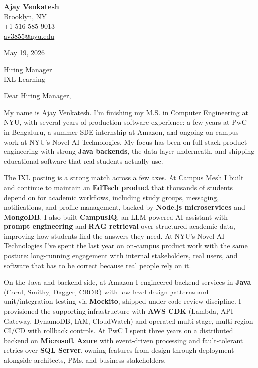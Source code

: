 \documentclass[letterpaper,11pt]{article}
\begin{document}
\begin{flushleft}
\textbf{\large Ajay Venkatesh} \\
Brooklyn, NY \\
+1 516 585 9013 \\
\href{mailto:av3855@nyu.edu}{av3855@nyu.edu}
\end{flushleft}

\vspace{10pt}

May 19, 2026

\vspace{6pt}

Hiring Manager \\
IXL Learning

\vspace{10pt}

Dear Hiring Manager,

My name is Ajay Venkatesh. I'm finishing my M.S. in Computer Engineering at NYU, with several years of production software experience: a few years at PwC in Bengaluru, a summer SDE internship at Amazon, and ongoing on-campus work at NYU's Novel AI Technologies. My focus has been on full-stack product engineering with strong \textbf{Java backends}, the data layer underneath, and shipping educational software that real students actually use.

The IXL posting is a strong match across a few axes. At Campus Mesh I built and continue to maintain an \textbf{EdTech product} that thousands of students depend on for academic workflows, including study groups, messaging, notifications, and profile management, backed by \textbf{Node.js microservices} and \textbf{MongoDB}. I also built \textbf{CampusIQ}, an LLM-powered AI assistant with \textbf{prompt engineering} and \textbf{RAG retrieval} over structured academic data, improving how students find the answers they need. At NYU's Novel AI Technologies I've spent the last year on on-campus product work with the same posture: long-running engagement with internal stakeholders, real users, and software that has to be correct because real people rely on it.

On the Java and backend side, at Amazon I engineered backend services in \textbf{Java} (Coral, Smithy, Dagger, CBOR) with low-level design patterns and unit/integration testing via \textbf{Mockito}, shipped under code-review discipline. I provisioned the supporting infrastructure with \textbf{AWS CDK} (Lambda, API Gateway, DynamoDB, IAM, CloudWatch) and operated multi-stage, multi-region CI/CD with rollback controls. At PwC I spent three years on a distributed backend on \textbf{Microsoft Azure} with event-driven processing and fault-tolerant retries over \textbf{SQL Server}, owning features from design through deployment alongside architects, PMs, and business stakeholders.
\end{document}
